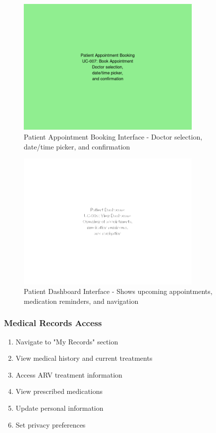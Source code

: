\documentclass[12pt,a4paper]{article}
\begin{document}
\begin{figure}[H]
\centering
\includegraphics[width=0.8\textwidth]{images/patient_booking.png}
\caption{Patient Appointment Booking Interface - Doctor selection, date/time picker, and confirmation}
\end{figure}

\begin{figure}[H]
\centering
\includegraphics[width=0.8\textwidth]{images/patient_dashboard.png}
\caption{Patient Dashboard Interface - Shows upcoming appointments, medication reminders, and navigation}
\end{figure}

\subsubsection{Medical Records Access}

\begin{enumerate}
    \item Navigate to "My Records" section
    \item View medical history and current treatments
    \item Access ARV treatment information
    \item View prescribed medications
    \item Update personal information
    \item Set privacy preferences
\end{enumerate}
\end{document}
